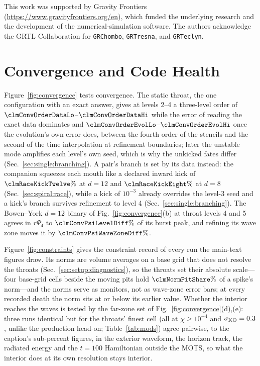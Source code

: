 \documentclass[twocolumn,floatfix,aps,prd,superscriptaddress,nofootinbib]{revtex4-2}
\makeatletter
\newcommand{\packfloatpages}{%
  \setlength{\@fptop}{0pt}%
  \setlength{\@fpsep}{12pt}%
  \setlength{\@fpbot}{0pt plus 1fil}%
  \setlength{\@dblfptop}{0pt}%
  \setlength{\@dblfpsep}{12pt}%
  \setlength{\@dblfpbot}{0pt plus 1fil}%
}
\makeatother
\begin{document}
\begin{acknowledgments}
This work was supported by Gravity Frontiers
(\url{https://www.gravityfrontiers.org/en}), which funded the underlying
research and the development of the numerical-simulation software. The authors
acknowledge the GRTL Collaboration for \texttt{GRChombo}, \texttt{GRTresna},
and \texttt{GRTeclyn}.
\end{acknowledgments}

\FloatBarrier

\appendix

\section{Convergence and Code Health}
\label{app:health}
\packfloatpages

Figure~\ref{fig:convergence} tests convergence. The static throat, the one configuration with an exact answer, gives at levels 2--4 a three-level order of $\clmConvOrderDataLo$--$\clmConvOrderDataHi$ while the error of reading the exact data dominates and $\clmConvOrderEvolLo$--$\clmConvOrderEvolHi$ once the evolution's own error does, between the fourth order of the stencils and the second of the time interpolation at refinement boundaries; later the unstable mode amplifies each level's own seed, which is why the unkicked fates differ (Sec.~\ref{sec:single:branching}). A pair's branch is set by its data instead: the companion squeezes each mouth like a declared inward kick of $\clmRaceKickTwelve\%$ at $d=12$ and $\clmRaceKickEight\%$ at $d=8$ (Sec.~\ref{sec:spiral:race}), while a kick of $10^{-3}$ already overrides the level-3 seed and a kick's branch survives refinement to level 4 (Sec.~\ref{sec:single:branching}). The Bowen--York $d=12$ binary of Fig.~\ref{fig:convergence}(b) at throat levels 4 and 5 agrees in $r\Psi_4$ to $\clmConvPsiLevelDiff\%$ of its burst peak, and refining its wave zone moves it by $\clmConvPsiWaveZoneDiff\%$.

Figure~\ref{fig:constraints} gives the constraint record of every run the main-text figures draw. Its norms are volume averages on a base grid that does not resolve the throats (Sec.~\ref{sec:setup:diagnostics}), so the throats set their absolute scale---four base-grid cells beside the moving pits hold $\clmNormPitShare\%$ of a spike's norm---and the norms serve as monitors, not as wave-zone error bars; at every recorded death the norm sits at or below its earlier value. Whether the interior reaches the waves is tested by the far-zone set of Fig.~\ref{fig:convergence}(d),(e): three runs identical but for the throats' finest cell (all at $\chi\ge10^{-4}$ and $\sigma_{\rm KO}=0.3$, unlike the production head-on; Table~\ref{tab:mods}) agree pairwise, to the caption's sub-percent figures, in the exterior waveform, the horizon track, the radiated energy and the $t=100$ Hamiltonian outside the MOTS, so what the interior does at its own resolution stays interior.
\end{document}
